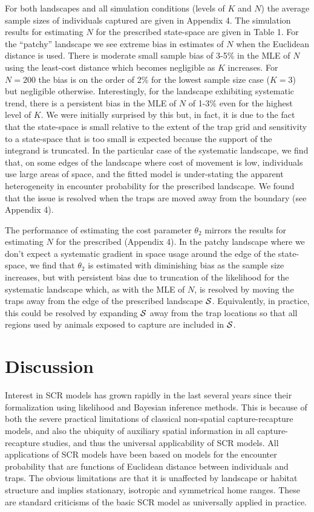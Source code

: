 \documentclass[12pt]{article}
\begin{document}
\begin{spacing}{1.8}
For both landscapes and all simulation conditions (levels of $K$ and
$N$) the average sample sizes of individuals captured are given in
Appendix 4.  The simulation results for estimating $N$
for the prescribed state-space are given in Table 1.
For the ``patchy'' landscape we see
extreme
bias in estimates of $N$ when the Euclidean distance is used. There is
moderate small sample bias of 3-5\% in the MLE of $N$ using the
least-cost distance which becomes negligible as $K$ increases. For
$N=200$ the bias is on the order of 2\% for the lowest sample size
case ($K=3$) but negligible otherwise.  Interestingly, for the
landscape exhibiting systematic trend, there is a persistent bias
in the MLE of $N$ of 1-3\% even for the highest level of $K$. We were
initially surprised by this but, in fact, it is due to the fact that
the state-space is small relative to the extent of the trap grid and
sensitivity to a state-space that is too small is expected because the
support of the integrand is truncated. In the particular case of the
systematic landscape, we find that, on some edges of the landscape
where cost of movement is low, individuals use large areas of space,
and the fitted model is under-stating the apparent
heterogeneity in encounter probability for the prescribed landscape.  We
found that the issue is resolved when the traps are moved away from
the boundary (see Appendix 4).

The performance of estimating the cost parameter $\theta_{2}$ mirrors
the results for estimating $N$ for the prescribed
(Appendix 4). In the
patchy landscape where we don't expect a systematic gradient in space
usage around the edge of the state-space, we find
that $\theta_{2}$ is estimated with
diminishing bias as the sample size increases, but with persistent
bias due to truncation of the likelihood for the systematic
landscape which, as with the MLE of $N$, is resolved by moving the
traps away from the edge of the prescribed landscape ${\cal S}$. Equivalently, in practice,
this could be resolved by expanding ${\cal S}$ away from the trap
locations so that all regions used by animals exposed to capture are
included in ${\cal S}$.



\section{Discussion}

Interest in SCR models has grown rapidly in the last several years
since their formalization using likelihood
\citep{borchers_efford:2008} and Bayesian \citep{royle_young:2008}
inference methods. This is because of both the severe practical
limitations of classical non-spatial capture-recapture models, and
also the ubiquity of auxiliary spatial information in all
capture-recapture studies, and thus the universal applicability of SCR
models.
All applications of SCR models have been based on models for the
encounter probability that are functions of Euclidean
distance between individuals and traps. The obvious limitations are
that it is unaffected by landscape or habitat structure and implies
stationary, isotropic and symmetrical home ranges. These are standard
criticisms of the basic SCR model as universally applied in practice.


\end{spacing}
\end{document}
